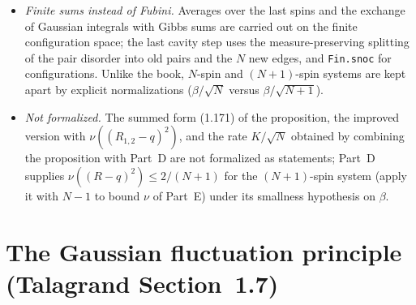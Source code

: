\begin{remark}
\begin{itemize}
  $s$-independent $\mathbb E\log\sum_a\exp B$; since the scalar field $v$ is the same for all
  configurations, it contributes $\mathbb Ev=0$ at $s=\pi/2$.  For the first term the log of the
  Gibbs average of $\cosh$ is turned into a signed log-partition function (index type
  $\{-1,1\}^N\times\{-1,1\}$) before differentiating.
\item \emph{Finite sums instead of Fubini.}  Averages over the last spins and the exchange of Gaussian
  integrals with Gibbs sums are carried out on the finite configuration space; the last cavity step uses the
  measure-preserving splitting of the pair disorder into old pairs and the $N$ new edges, and
  \texttt{Fin.snoc} for configurations.  Unlike the book, $N$-spin and $(N+1)$-spin systems are kept
  apart by explicit normalizations ($\beta/\sqrt N$ versus $\beta/\sqrt{N+1}$).
\item \emph{Not formalized.}  The summed form (1.171) of the proposition, the improved version with
  $\nu((R_{1,2}-q)^2)$, and the rate $K/\sqrt N$ obtained by combining the proposition with Part~D are
  not formalized as statements; Part~D supplies $\nu((R-q)^2)\le2/(N+1)$ for the $(N+1)$-spin system
  (apply it with $N-1$ to bound $\nu$ of Part~E) under its smallness hypothesis on $\beta$.
\end{itemize}
\end{remark}

\section{The Gaussian fluctuation principle (Talagrand Section~1.7)}
\label{sec:sg-tal:fluct}


